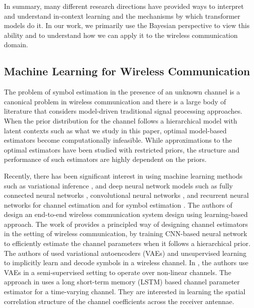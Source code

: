 \documentclass[journal,letterpaper,onecolumn]{IEEEtran}
\begin{document}
In summary, many different research directions have provided ways to interpret and understand in-context learning and the mechanisms by which transformer models do it. In our work, we primarily use the Bayesian perspective to view this ability and to understand how we can apply it to the wireless communication domain.

\subsection{Machine Learning for Wireless Communication}
The problem of symbol estimation in the presence of an unknown channel is a canonical problem in wireless communication and there is a large body of literature that considers model-driven traditional signal processing approaches. 
When the prior distribution for the channel follows a hierarchical model with latent contexts such as what we study in this paper, optimal model-based estimators become computationally infeasible. 
While approximations to the optimal estimators have been studied with restricted priors, the structure and performance of such estimators are highly dependent on the priors.






Recently, there has been significant interest in using machine learning methods such as variational inference \cite{ChannelEstimationUsingVAE}, \cite{UnsupervisedEqualizationUsingVAEs} and deep neural network models such as fully connected neural networks \cite{DeepLearningAidedChannelEstimation}, convolutional neural networks \cite{LearningMMSEChannelEstimator}, and recurrent neural networks \cite{RNNforChannelEstimation} 
for channel estimation and for symbol estimation \cite{aoudia2021end}. The authors of \cite{faycal} design an  end-to-end wireless communication system design using learning-based approach.
The work of \cite{neumann} provides a principled way of designing channel estimators in the setting of wireless communication, by training CNN-based neural network to efficiently estimate the channel parameters when it follows a hierarchical prior. The authors of \cite{UnsupervisedLinearAndNonLinearChannelEqAndDecoding} used variational autoencoders (VAEs) and unsupervised learning to implicitly learn and decode symbols in a wireless channel. In \cite{SemisupervisedVAEForNonLinearChannels}, the authors use VAEs in a semi-supervised setting to operate over non-linear channels. The approach in \cite{deepLearningForTimeVaryingMIMOChannels} uses a long short-term memory (LSTM) based channel parameter estimator for a time-varying channel. They are interested in learning the spatial correlation structure of the channel coefficients across the receiver antennae.
 
\end{document}
